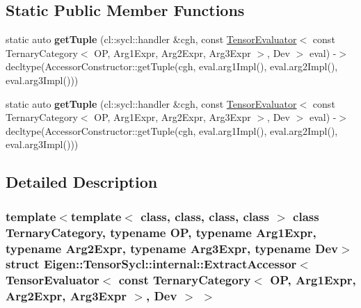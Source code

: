 \subsection*{Static Public Member Functions}
\begin{DoxyCompactItemize}
\item 
\mbox{\label{struct_eigen_1_1_tensor_sycl_1_1internal_1_1_extract_accessor_3_01_tensor_evaluator_3_01const_010235c7f46e01985cfd9706474c83e49e_a7fce13c4b18c8be698097764ec982378}} 
static auto {\bfseries get\+Tuple} (cl\+::sycl\+::handler \&cgh, const \hyperlink{struct_eigen_1_1_tensor_evaluator}{Tensor\+Evaluator}$<$ const Ternary\+Category$<$ OP, Arg1\+Expr, Arg2\+Expr, Arg3\+Expr $>$, Dev $>$ eval) -\/$>$ decltype(Accessor\+Constructor\+::get\+Tuple(cgh, eval.\+arg1\+Impl(), eval.\+arg2\+Impl(), eval.\+arg3\+Impl()))
\item 
\mbox{\label{struct_eigen_1_1_tensor_sycl_1_1internal_1_1_extract_accessor_3_01_tensor_evaluator_3_01const_010235c7f46e01985cfd9706474c83e49e_a7fce13c4b18c8be698097764ec982378}} 
static auto {\bfseries get\+Tuple} (cl\+::sycl\+::handler \&cgh, const \hyperlink{struct_eigen_1_1_tensor_evaluator}{Tensor\+Evaluator}$<$ const Ternary\+Category$<$ OP, Arg1\+Expr, Arg2\+Expr, Arg3\+Expr $>$, Dev $>$ eval) -\/$>$ decltype(Accessor\+Constructor\+::get\+Tuple(cgh, eval.\+arg1\+Impl(), eval.\+arg2\+Impl(), eval.\+arg3\+Impl()))
\end{DoxyCompactItemize}


\subsection{Detailed Description}
\subsubsection*{template$<$template$<$ class, class, class, class $>$ class Ternary\+Category, typename OP, typename Arg1\+Expr, typename Arg2\+Expr, typename Arg3\+Expr, typename Dev$>$\newline
struct Eigen\+::\+Tensor\+Sycl\+::internal\+::\+Extract\+Accessor$<$ Tensor\+Evaluator$<$ const Ternary\+Category$<$ O\+P, Arg1\+Expr, Arg2\+Expr, Arg3\+Expr $>$, Dev $>$ $>$}

